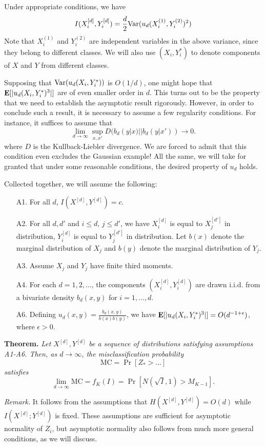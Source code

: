 \documentclass[12pt]{article}
\begin{document}
Under appropriate conditions, we have
\[
I(X_i^{[d]}, Y_i^{[d]}) = \frac{d}{2}\text{Var}(u_d(X_i^{(1)}, Y_i^{(2)})^2)
\]
Note that $X_i^{(1)}$ and $Y_i^{(2)}$ are independent variables in the
above variance, since they belong to different classes.  We will also
use $(X_i, Y_i^*)$ to denote components of $X$ and $Y$ from different
classes.

Supposing that $\text{Var}(u_d(X_i, Y_i^*))$ is $O(1/d)$, one might hope
that $\textbf{E}[|u_d(X_i, Y_i^*)^3|]$ are of even smaller order in $d$.  This
turns out to be the property that we need to establish the asymptotic
result rigorously.  However, in order to conclude such a result, it is
necessary to assume a few regularity conditions.  For instance, it suffices to assume that
\[
\lim_{d \to \infty} \sup_{x, x'} D(b_d(y|x)|| b_d(y|x')) \to 0.
\]
where $D$ is the Kullback-Liebler divergence.  We are forced to admit
that this condition even excludes the Gaussian example!  All the same,
we will take for granted that under some reasonable conditions, the
desired property of $u_d$ holds.

Collected together, we will assume the following:
\begin{itemize}
\item[A1. ] For all $d$, $I(X^{[d]}, Y^{[d]}) = c$.
\item[A2. ] For all $d, d'$ and $i \leq d$, $j \leq d'$, we have $X_i^{[d]}$ is equal to $X_j^{[d']}$ in distribution,
$Y_i^{[d]}$ is equal to $Y_j^{[d']}$ in distribution.  Let $b(x)$
denote the marginal distribution of $X_j$ and $b(y)$ denote the
marginal distribution of $Y_j$.
\item[A3. ] Assume $X_j$ and $Y_j$ have finite third moments.
\item[A4. ] For each $d = 1,2,\hdots$, the components $(X_i^{[d]}, Y_i^{[d]})$ are drawn i.i.d. from a bivariate density
$b_d(x, y)$ for $i = 1,\hdots, d$.
\item[A6. ] Defining $u_d(x, y) = \frac{b_d(x, y)}{b(x)b(y)}$,
we have $\textbf{E}[|u_d(X_i, Y_i^*)^3|] = O(d^{-1 + \epsilon})$, where
$\epsilon > 0$.
\end{itemize}

\textbf{Theorem. }  
\emph{
Let $X^{[d]}, Y^{[d]}$ be a sequence of distributions satisfying
assumptions A1-A6.  Then, as $d \to \infty$, the misclassification
probability
\[
\text{MC} = \Pr[Z_* > ...]
\]
satisfies
\[
\lim_{d \to \infty} \text{MC} = f_K(I) = \Pr[N(\sqrt{I}, 1) > M_{K-1}].
\]
}

\emph{Remark.}
It follows from the assumptions that $H(X^{[d]}, Y^{[d]}) = O(d)$ while $I(X^{[d]};
Y^{[d]})$ is fixed.  These assumptions are sufficient for asymptotic
normality of $Z_i$, but asymptotic normality also follows from much
more general conditions, as we will discuss.
\end{document}
